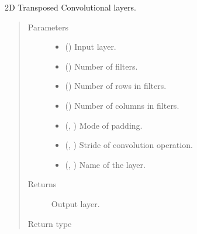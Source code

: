 \documentclass[letterpaper,10pt,english]{sphinxmanual}
\begin{document}

\begin{fulllineitems}
\label{\detokenize{models/multiresunet:models.multiresunet.trans_conv2d_bn}}
2D Transposed Convolutional layers.
\begin{quote}\begin{description}
\item[{Parameters}] \leavevmode\begin{itemize}
\item {} 
 () \textendash{} Input layer.

\item {} 
 () \textendash{} Number of filters.

\item {} 
 () \textendash{} Number of rows in filters.

\item {} 
 () \textendash{} Number of columns in filters.

\item {} 
 (, ) \textendash{} Mode of padding.

\item {} 
 (, ) \textendash{} Stride of convolution operation.

\item {} 
 (, ) \textendash{} Name of the layer.

\end{itemize}

\item[{Returns}] \leavevmode
{} \textendash{} Output layer.

\item[{Return type}] \leavevmode
{}

\end{description}\end{quote}

\end{fulllineitems}
\end{document}
